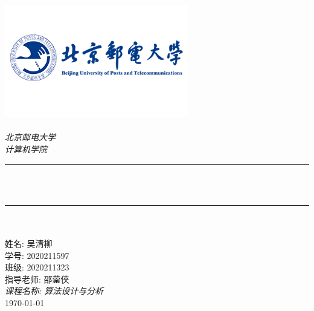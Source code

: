 \begin{titlepage}
    \newcommand{\HRule}{\rule{\linewidth}{0.5mm}}
    \includegraphics[width=8cm]{title/logo_bupt.png}\\[1cm]
    \center
    \quad\\[1.5cm]
    \textsl{\Large 北京邮电大学}\\[0.5cm]
    \textsl{\large  计算机学院}\\[0.5cm]
    \makeatletter
    \HRule \\[0.4cm]
    {\huge \bfseries \@title}\\[0.4cm]
    \HRule \\[1.5cm]
    \\[2cm] %
    \makeatother
    {\large 姓名: 吴清柳}\\[0.5cm]
    {\large 学号: 2020211597}\\[0.5cm]
    {\large 班级: 2020211323}\\[0.5cm]
    {\large 指导老师: 邵蓥侠}\\[0.5cm]
    {\large \emph{课程名称: 算法设计与分析}}\\[0.5cm]
    {\large \today}\\[2cm]
    \vfill
\end{titlepage}
